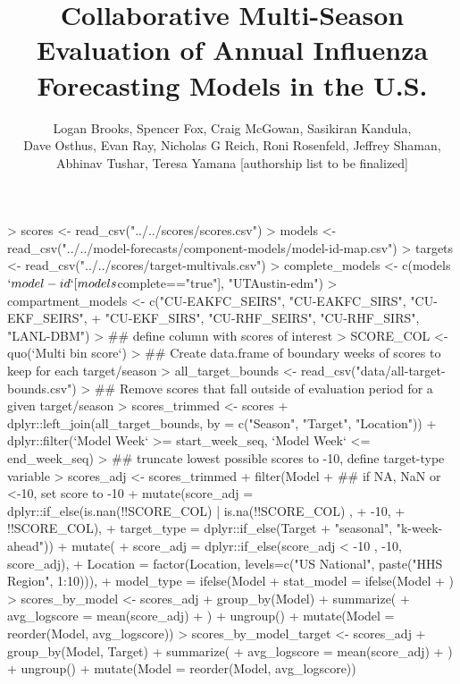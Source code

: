 \documentclass{article}
\title{Collaborative Multi-Season Evaluation of Annual Influenza Forecasting Models in the U.S.}
\author{Logan Brooks, Spencer Fox, Craig McGowan, Sasikiran Kandula, \\ Dave Osthus, Evan Ray, Nicholas G Reich, Roni Rosenfeld, Jeffrey Shaman, \\Abhinav Tushar, Teresa Yamana [authorship list to be finalized]}
\begin{document}


\maketitle

\tableofcontents


\begin{Schunk}
\begin{Sinput}
> scores <- read_csv("../../scores/scores.csv")
> models <- read_csv("../../model-forecasts/component-models/model-id-map.csv")
> targets <- read_csv("../../scores/target-multivals.csv")
> complete_models <- c(models$`model-id`[models$complete=="true"], "UTAustin-edm")
> compartment_models <- c("CU-EAKFC_SEIRS", "CU-EAKFC_SIRS", "CU-EKF_SEIRS", 
+     "CU-EKF_SIRS", "CU-RHF_SEIRS", "CU-RHF_SIRS", "LANL-DBM")
> ## define column with scores of interest
> SCORE_COL <- quo(`Multi bin score`)
> ## Create data.frame of boundary weeks of scores to keep for each target/season
> all_target_bounds <- read_csv("data/all-target-bounds.csv")
> ## Remove scores that fall outside of evaluation period for a given target/season
> scores_trimmed <- scores %
+     dplyr::left_join(all_target_bounds, by = c("Season", "Target", "Location")) %
+     dplyr::filter(`Model Week` >= start_week_seq, `Model Week` <= end_week_seq)
> ## truncate lowest possible scores to -10, define target-type variable
> scores_adj <- scores_trimmed %
+     filter(Model %
+     ## if NA, NaN or <-10, set score to -10
+     mutate(score_adj = dplyr::if_else(is.nan(!!SCORE_COL) | is.na(!!SCORE_COL) , 
+         -10, 
+         !!SCORE_COL),
+         target_type = dplyr::if_else(Target %
+             "seasonal", "k-week-ahead")) %
+     mutate(
+         score_adj = dplyr::if_else(score_adj < -10 , -10, score_adj),
+         Location = factor(Location, levels=c("US National", paste("HHS Region", 1:10))),
+         model_type = ifelse(Model %
+         stat_model = ifelse(Model %
+         ) 
> scores_by_model <- scores_adj %
+     group_by(Model) %
+     summarize(
+         avg_logscore = mean(score_adj)
+     ) %
+     ungroup() %
+     mutate(Model = reorder(Model, avg_logscore))
> scores_by_model_target <- scores_adj %
+     group_by(Model, Target) %
+     summarize(
+         avg_logscore = mean(score_adj)
+     ) %
+     ungroup() %
+     mutate(Model = reorder(Model, avg_logscore))

\end{Sinput}
\end{Schunk}
\end{document}
